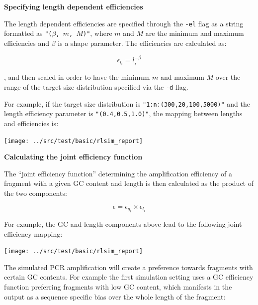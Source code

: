 \vspace{1em}\textbf{Specifying length dependent efficiencies}\vspace{1em}

The length dependent efficiencies are specified through the \texttt{-el} flag as a string formatted as \texttt{"($\beta$, $m$, $M$)"}, where $m$ and $M$ are the minimum and maximum efficiencies and $\beta$ is a shape parameter. The efficiencies are calculated as:

\begin{equation}
    \epsilon_{l_i} = l_{i}^{-\beta}
\end{equation}

, and then scaled in order to have the minimum $m$ and maximum $M$ over the range of the target size distribution specified via the \texttt{-d} flag.

For example, if the target size distribution is \texttt{"1:n:(300,20,100,5000)"} and the length efficiency parameter is \texttt{"(0.4,0.5,1.0)"}, the mapping between lengths and efficiencies is:

\begin{center}
    \texttt{[image: ../src/test/basic/rlsim\_report]}
\end{center}


\vspace{1em}\textbf{Calculating the joint efficiency function}\vspace{1em}

The ``joint efficiency function'' determining the amplification efficiency of a fragment with a given GC content and length is then
calculated as the product of the two components:

\begin{equation}
    \epsilon = \epsilon_{g_i} \times \epsilon_{l_i}
\end{equation}

For example, the GC and length components above lead to the following joint efficiency mapping:

\begin{center}
    \texttt{[image: ../src/test/basic/rlsim\_report]}
\end{center}

The simulated PCR amplification will create a preference towards fragments with certain GC contents.
For example the first simulation setting uses a GC efficiency function preferring fragments with low GC content, which manifests in the output
as a sequence specific bias over the whole length of the fragment:

